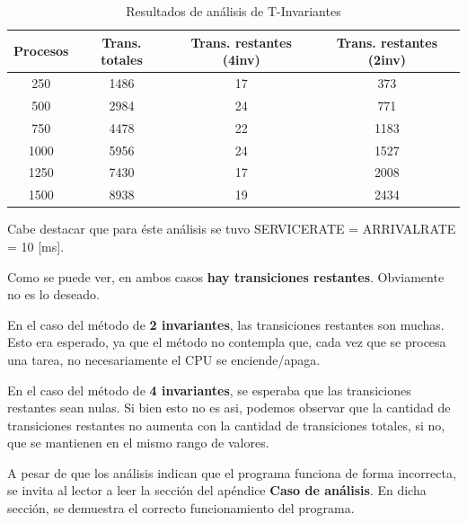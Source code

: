 \documentclass{article}
\begin{document}
    \begin{center}
        \begin{table}[H]
            \centering
            \begin{tabular}{||c|c|c|c||} 
                \hline
                Procesos & Trans. totales & Trans. restantes (4inv) & Trans. restantes (2inv) \\ [0.5ex] 
                \hline\hline
                250 & 1486 & 17 & 373 \\ 
                \hline
                500 & 2984 & 24 & 771 \\
                \hline
                750 & 4478 & 22 & 1183 \\
                \hline
                1000 & 5956 & 24 & 1527 \\
                \hline
                1250 & 7430 & 17 & 2008 \\
                \hline
                1500 & 8938 & 19 & 2434 \\
                \hline
            \end{tabular}
            \caption{Resultados de análisis de T-Invariantes}
        \end{table}
    \end{center} \par
    Cabe destacar que para éste análisis se tuvo SERVICERATE = ARRIVALRATE = 10 [ms]. \par
    Como se puede ver, en ambos casos \textbf{hay transiciones restantes}. Obviamente no es
    lo deseado. \par
    En el caso del método de \textbf{2 invariantes}, las transiciones restantes son muchas.
    Esto era esperado, ya que el método no contempla que, cada vez que se procesa una tarea,
    no necesariamente el CPU se enciende/apaga. \par
    En el caso del método de \textbf{4 invariantes}, se esperaba que las transiciones 
    restantes sean nulas. Si bien esto no es asi, podemos observar que la cantidad de 
    transiciones restantes no aumenta con la cantidad de transiciones totales, si no, que se
    mantienen en el mismo rango de valores. \newline \par 
    A pesar de que los análisis indican que el programa funciona de forma incorrecta, se
    invita al lector a leer la sección del apéndice \textbf{Caso de análisis}. En dicha 
    sección, se demuestra el correcto funcionamiento del programa.
\end{document}
